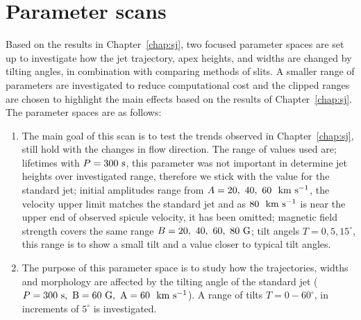 \documentclass[12pt]{ociamthesis}
\newcommand{\kms}{~\rm{km ~s^{-1}}}
\begin{document}
\section{Parameter scans}
\label{sec:pscansII}
Based on the results in Chapter~\ref{chap:sj}, two focused parameter spaces are set up to investigate how the jet trajectory, apex heights, and widths are changed by tilting angles, in combination with comparing methods of slits. A smaller range of parameters are investigated to reduce computational cost and the clipped ranges are chosen to highlight the main effects based on the results of Chapter~\ref{chap:sj}. The parameter spaces are as follows:
\begin{enumerate}
\item The main goal of this scan is to test the trends observed in Chapter~\ref{chap:sj}, still hold with the changes in flow direction. The range of values used are; lifetimes with $P=300~\rm{s}$, this parameter was not important in determine jet heights over investigated range, therefore we stick with the value for the standard jet; initial amplitudes range from $A=20,~40,~60~\kms$, the  velocity upper limit matches the standard jet and as $80~\kms$ is near the upper end of observed spicule velocity, it has been omitted; magnetic field strength covers the same range $B=20,~40,~60,~80~\rm{G}$; tilt angels $T=0,5,15^{\circ}$, this range is to show a small tilt and a value closer to typical tilt angles.  

\item The purpose of this parameter space is to study how the trajectories, widths and morphology are affected by the tilting angle of the standard jet ($P=300~\rm{s}, ~B=60~\rm{G}, ~A=60~\kms$). A range of tilts $T=0-60^{\circ}$, in increments of $5^{\circ}$ is investigated.   
\end{enumerate}
%
\end{document}
